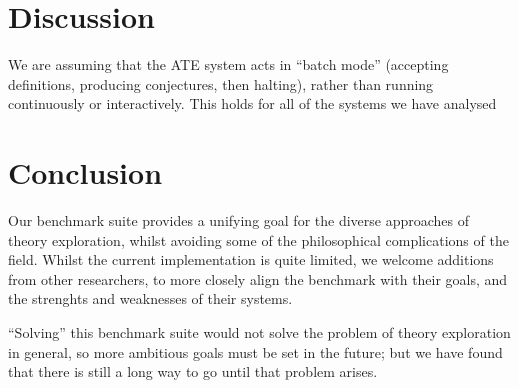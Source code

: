 


\section{Discussion}
\label{sec:discussion}

We are assuming that the ATE system acts in ``batch mode'' (accepting
definitions, producing conjectures, then halting), rather than running
continuously or interactively. This holds for all of the systems we have
analysed



\section{Conclusion}
\label{sec:conclusion}


Our benchmark suite provides a unifying goal for the diverse approaches of
theory exploration, whilst avoiding some of the philosophical complications of
the field. Whilst the current implementation is quite limited, we welcome
additions from other researchers, to more closely align the benchmark with their
goals, and the strenghts and weaknesses of their systems.

``Solving'' this benchmark suite would not solve the problem of theory
exploration in general, so more ambitious goals must be set in the future; but
we have found that there is still a long way to go until that problem arises.

%





